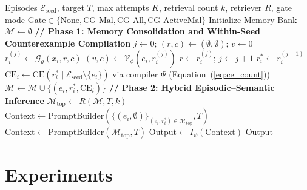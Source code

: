 \documentclass[10pt,a4paper,onecolumn]{article}
\theoremstyle{definition}
\theoremstyle{remark}
\begin{document}
\begin{algorithm}[!t]
\caption{Verified Localized Episodic Grounding with Counterexample Gating (VLEG / VLEG-CG)}
\label{alg:vleg_final}
\small
\begin{algorithmic}[1]
\Require Episodes $\mathcal{E}_{\mathrm{seed}}$, target $T$, max attempts $K$, retrieval count $k$, retriever $R$, gate mode $\mathrm{Gate} \in \{\text{None}, \text{CG-Mal}, \text{CG-All}, \text{CG-ActiveMal}\}$
\State Initialize Memory Bank $\mathcal{M} \gets \emptyset$
\State \textbf{// Phase 1: Memory Consolidation and Within-Seed Counterexample Compilation}
    \State $j \gets 0$; $(r,c) \gets (\emptyset,\emptyset)$; $v \gets 0$
        \State $r_i^{(j)} \gets \mathcal{G}_\theta(x_i, r, c)$ 
        \State $(v, c) \gets \mathcal{V}_\phi(e_i, r_i^{(j)})$ 
        \State $r \gets r_i^{(j)}$; $j \gets j + 1$
    \EndWhile
        \State $r_i^* \gets r_i^{(j-1)}$
        \State $\mathrm{CE}_i \gets \mathrm{CE}(r_i^* \mid \mathcal{E}_{\mathrm{seed}} \setminus \{e_i\})$ via compiler $\Psi$ (Equation~(\ref{eq:ce_count}))
        \State $\mathcal{M} \gets \mathcal{M} \cup \{(e_i, r_i^*, \mathrm{CE}_i)\}$ 
    \EndIf
\EndFor
\State \textbf{// Phase 2: Hybrid Episodic--Semantic Inference}
\State $\mathcal{M}_{\mathrm{top}} \gets R(\mathcal{M}, T, k)$ 
    \State $\mathrm{Context} \gets \mathrm{PromptBuilder}(\{(e_i, \emptyset)\}_{(e_i,r_i^*)\in\mathcal{M}_{\mathrm{top}}}, T)$ 
\Else
    \State $\mathrm{Context} \gets \mathrm{PromptBuilder}(\mathcal{M}_{\mathrm{top}}, T)$ 
\EndIf
\State $\mathrm{Output} \gets I_\psi(\mathrm{Context})$ 
\State \Return $\mathrm{Output}$
\end{algorithmic}
\end{algorithm}

\section{Experiments}
\end{document}
